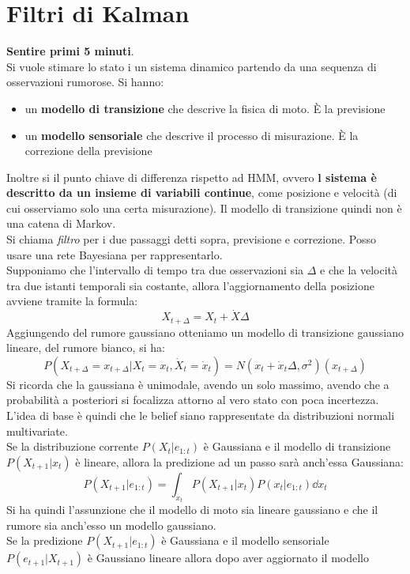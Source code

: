 \documentclass[a4paper,12pt, oneside]{book}
\begin{document}
\chapter{Filtri di Kalman}
\textbf{Sentire primi 5 minuti}.\\
Si vuole stimare lo stato i un sistema dinamico partendo da una sequenza di
osservazioni rumorose. Si hanno:
\begin{itemize}
  \item un \textbf{modello di transizione} che descrive la fisica di moto. È la
  previsione 
  \item un \textbf{modello sensoriale} che descrive il processo di
  misurazione. È la correzione della previsione
\end{itemize}
Inoltre si il punto chiave di differenza rispetto ad HMM, ovvero \textbf{l
  sistema è descritto da un insieme di variabili continue}, come posizione e
velocità (di cui osserviamo solo una certa misurazione). Il modello di
transizione quindi non è una catena di Markov.\\ 
Si chiama \textit{filtro} per i due passaggi detti sopra, previsione e
correzione. Posso usare una rete Bayesiana per rappresentarlo.\\
Supponiamo che l’intervallo di tempo tra due osservazioni sia $\Delta$ e che la
velocità tra due istanti temporali sia costante, allora l’aggiornamento della
posizione avviene tramite la formula:
\[X_{t+\Delta}=X_t+\dot{X}\Delta\]
Aggiungendo del rumore gaussiano otteniamo un modello di transizione gaussiano
lineare, del rumore bianco, si ha:
\[P(X_{t+\Delta}=x_{t+\Delta}|X_t=x_t,\dot{X}_t=\dot{x}_t)=
  N(x_t+\dot{x}_t\Delta,\sigma^2)(x_{t+\Delta})\]
Si ricorda che la gaussiana è unimodale, avendo un solo massimo, avendo che a
probabilità a posteriori si focalizza attorno al vero stato con poca
incertezza. \\
L'idea di base è quindi che le belief siano rappresentate da distribuzioni
normali multivariate.\\
Se la distribuzione corrente $P(X_t|e_{1:t})$ è Gaussiana e il modello di
transizione $P(X_{t+1}|x_{t})$ è lineare, allora la predizione ad un passo sarà
anch’essa Gaussiana:
\[P(X_{t+1}|e_{1:t})=\int_{x_t}P(X_{t+1}|x_t)P(x_t|e_{1:t})\dd{x_t}\]
Si ha quindi l'assunzione che il modello di moto sia lineare gaussiano e che il
rumore sia anch'esso un modello gaussiano.\\
Se la predizione $P(X_{t+1}|e_{1:t})$ è Gaussiana e il modello sensoriale
$P(e_{t+1}|X_{t+1})$ è Gaussiano lineare allora dopo aver aggiornato il modello
\end{document}
